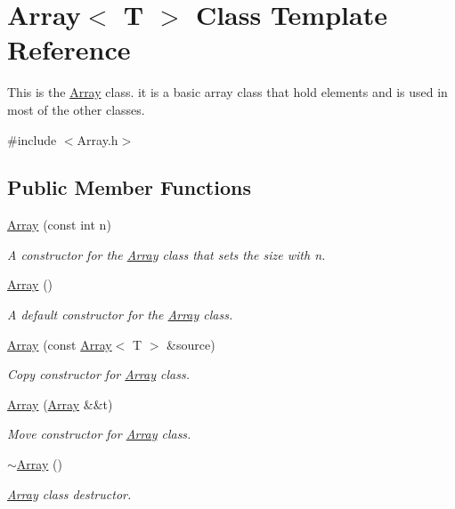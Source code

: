 \hypertarget{classArray}{}\section{Array$<$ T $>$ Class Template Reference}
\label{classArray}


This is the \hyperlink{classArray}{Array} class. it is a basic array class that hold elements and is used in most of the other classes.  




{\ttfamily \#include $<$Array.\+h$>$}

\subsection*{Public Member Functions}
\begin{DoxyCompactItemize}
\item 
\hyperlink{classArray_a3e6c713fc9ea25ca99e62a5f8892ac07}{Array} (const int n)
\begin{DoxyCompactList}\small\item\em A constructor for the \hyperlink{classArray}{Array} class that sets the size with n. \end{DoxyCompactList}\item 
\hyperlink{classArray_ae25f6d485704fca18289aa16e10b2fa8}{Array} ()
\begin{DoxyCompactList}\small\item\em A default constructor for the \hyperlink{classArray}{Array} class. \end{DoxyCompactList}\item 
\hyperlink{classArray_a91caaf68a528574f5843a01050e35cee}{Array} (const \hyperlink{classArray}{Array}$<$ T $>$ \&source)
\begin{DoxyCompactList}\small\item\em Copy constructor for \hyperlink{classArray}{Array} class. \end{DoxyCompactList}\item 
\hyperlink{classArray_ad95dc94e9c7aaa6e6be2ee1804a335bd}{Array} (\hyperlink{classArray}{Array} \&\&t)
\begin{DoxyCompactList}\small\item\em Move constructor for \hyperlink{classArray}{Array} class. \end{DoxyCompactList}\item 
\hyperlink{classArray_aab89a85b1ddb86864096acdcc0db439e}{$\sim$\+Array} ()
\begin{DoxyCompactList}\small\item\em \hyperlink{classArray}{Array} class destructor. \end{DoxyCompactList}\item 

\end{DoxyCompactItemize}
